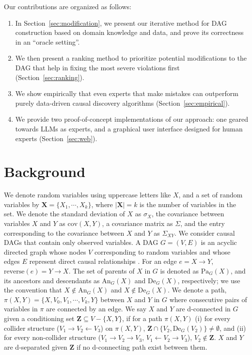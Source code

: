 \documentclass{uai2025} %
\begin{document}
Our contributions are organized as follows:

\begin{enumerate}
    \item In Section~\ref{sec:modification}, we present our iterative method for DAG construction
	based on domain knowledge and data, and prove its correctness in an ``oracle setting''.
    \item We then present a ranking method to prioritize potential modifications to the DAG that 
    	    help in fixing the most severe violations first (Section~\ref{sec:ranking}).
    \item We show empirically that even experts that make mistakes can outperform purely 
	data-driven
	causal discovery algorithms (Section~\ref{sec:empirical}).
    \item We provide two proof-of-concept implementations of our approach: one geared towards
	LLMs as experts, and a graphical user interface designed 
	for human experts (Section~\ref{sec:web}).
\end{enumerate}

\section{Background}
\label{sec:background}
We denote random variables using uppercase letters like $X$, and a set of
random variables by $ \bm{X} = \{X_1, \cdots, X_k\} $, where $ \rvert \bm{X}
\rvert = k $ is the number of variables in the set. We denote the standard
deviation of $ X $ as $ \sigma_X $, the covariance between variables $ X $ and
$ Y $ as $ \mathrm{cov}(X, Y) $, a covariance matrix as $ \Sigma $, and the
entry corresponding to the covariance between $ X $ and $ Y $ as $ \Sigma_{XY}
$. We consider causal DAGs that contain only observed variables. A DAG $ G =
(V, E) $ is an acyclic directed graph whose nodes $ V $ corresponding to random
variables and whose edges $ E $ represent direct causal relationships
\cite{Pearl2009}. For an edge $e=X \to Y$, $\textrm{reverse}(e)=Y \to X$. The
set of parents of $ X $ in $ G $ is denoted as $ \textrm{Pa}_G(X) $, and its
ancestors and descendants as $ \textrm{An}_G(X) $ and $ \textrm{De}_G(X) $,
respectively; we use the convention that $X \notin \textrm{An}_G(X)$ and $X
\notin \textrm{De}_G(X)$. We denote a path, $ \pi(X, Y) = \{ X, V_0, V_1,
\cdots, V_k, Y \} $ between $ X $ and $ Y $ in $ G $ where consecutive pairs of
variables in $ \pi $ are connected by an edge. We say $ X $ and $ Y $ are
d-connected in $ G $ given a conditioning set $ \bm{Z} \subseteq V - \{X, Y\}
$, if for a path $ \pi(X, Y) $ (i) for every collider structure ($ V_1
\rightarrow V_2 \leftarrow V_3 $) on $ \pi(X, Y) $, $ \bm{Z} \cap \{ V_2,
\textrm{De}_G(V_2) \} \ne \emptyset $, and (ii) for every non-collider
structure ($ V_1 \rightarrow V_2 \rightarrow V_3 $, $ V_1 \leftarrow V_2
\rightarrow V_3 $), $ V_2 \not \in \bm{Z} $. $ X $ and $ Y $ are d-separated
given $ \bm{Z} $ if no d-connecting path exist between them.
\end{document}
